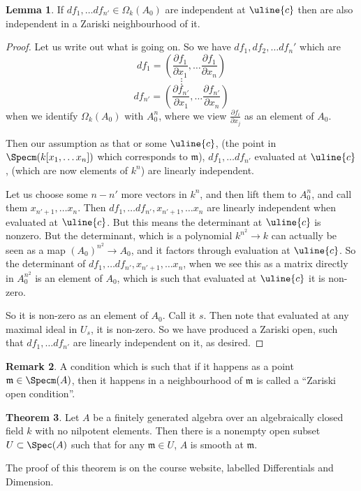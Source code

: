 \documentclass[12 pt]{article}
\theoremstyle{definition}
\newtheorem{thm}{Theorem}[section]
\newtheorem{lemma}[thm]{Lemma}
\newtheorem{rmk}[thm]{Remark}
\renewcommand{\(}{\left(}
\renewcommand{\)}{\right)}
\newcommand\fm{{\mathfrak m}}
\begin{document}
\begin{lemma} If $df_1, \ldots df_{n'} \in \Omega_k(A_0)$ are independent at $\uline{c}$ then are also independent in a Zariski neighbourhood of it.
\label{diff forms lin indep is Zariski open cond}
\end{lemma}
\begin{proof} Let us write out what is going on. So we have $df_1, df_2, \ldots df_n'$ which are
\[df_1=\(\frac{\partial f_1}{\partial x_1}, \ldots \frac{\partial f_1}{\partial x_n}\)\]
\[\vdots\]
\[df_{n'}=\(\frac{\partial f_{n'}}{\partial x_1}, \ldots \frac{\partial f_{n'}}{\partial x_n}\)\]
when we identify $\Omega_k(A_0)$ with $A_0^n$, where we view $\frac{\partial f_i}{\partial x_j}$ as an element of $A_0$.

Then our assumption as that or some $\uline{c}$, (the point in $\Specm(k[x_1, \ldots x_n])$ which corresponds to $\fm$), $df_1, \ldots df_{n'}$ evaluated at $\uline{c}$, (which are now elements of $k^{n}$) are linearly independent.

Let us choose some $n-n'$ more vectors in $k^n$, and then lift them to $A_0^n$, and call them $x_{n'+1}, \ldots x_n$. Then $df_1, \ldots df_{n'}, x_{n'+1}, \ldots x_n$ are linearly independent when evaluated at $\uline{c}$. But this means the determinant at $\uline{c}$ is nonzero. But the determinant, which is a polynomial $k^{n^2} \to k$ can actually be seen as a map $(A_0)^{n^2} \to A_0$, and it factors through evaluation at $\uline{c}$. So the determinant of $df_1, \ldots df_{n'}, x_{n'+1}, \ldots x_n$, when we see this as a matrix directly in $A_0^{n^2}$ is an element of $A_0$, which is such that evaluated at $\uline{c}$ it is non-zero.

So it is non-zero as an element of $A_0$. Call it $s$. Then note that evaluated at any maximal ideal in $U_s$, it is non-zero. So we have produced a Zariski open, such that $df_1, \ldots df_{n'}$ are linearly independent on it, as desired.

\end{proof}

\begin{rmk} A condition which is such that if it happens as a point $\fm \in \Specm(A)$, then it happens in a neighbourhood of $\fm$ is called a ``Zariski open condition''.
\label{Zariski open cond}
\end{rmk}



\begin{thm}
Let $A$ be a finitely generated algebra over an algebraically closed field $k$ with no nilpotent elements. Then there is a nonempty open subset $U \subset \Spec(A)$ such that for any $\fm \in U$, $A$ is smooth at $\fm$.
\end{thm}
The proof of this theorem is on the course website, labelled Differentials and Dimension.
\end{document}
